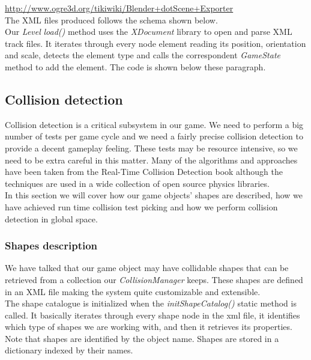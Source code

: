 \url{http://www.ogre3d.org/tikiwiki/Blender+dotScene+Exporter}\\

The XML files produced follows the schema shown below.\\



Our \textit{Level} \textit{load()} method uses the \textit{XDocument} library to
open and parse XML track files. It iterates through every node element
reading its position, orientation and scale, detects the element type
and calls the correspondent \textit{GameState} method to add the element. The
code is shown below these paragraph.\\



\subsection{Collision detection}
\label{sec:collision-detection}

Collision detection is a critical subsystem in our game. We need to perform a big number
of tests per game cycle and we need a fairly precise collision detection to provide
a decent gameplay feeling. These tests may be resource intensive, so we need to be extra
careful in this matter. Many of the algorithms and approaches have been taken from the
Real-Time Collision Detection book \cite{eric05} although the techniques are used
in a wide collection of open source physics libraries.\\

In this section we will cover how our game objects' shapes are described, how we
have achieved run time collision test picking and how we perform collision detection in
global space.

\subsubsection{Shapes description}

We have talked that our game object may have collidable shapes that can be retrieved from
a collection our \textit{CollisionManager} keeps. These shapes are defined in an XML
file making the system quite customizable and extensible.\\



The shape catalogue is initialized when the \textit{initShapeCatalog()} static method is
called. It basically iterates through every shape node in the xml file, it identifies
which type of shapes we are working with, and then it retrieves its properties. Note
that shapes are identified by the object name. Shapes are stored in a dictionary
indexed by their names.\\

